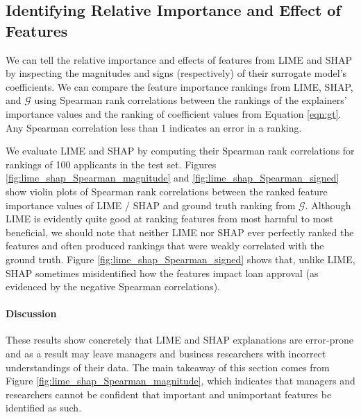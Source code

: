 \documentclass[12pt]{article}    %
\begin{document}
    \subsection*{Identifying Relative Importance and Effect of Features}
        \label{sec:relative_and_signed_importance}
        We can tell the relative importance and effects of features from LIME and SHAP by inspecting the magnitudes and signs (respectively) of their surrogate model's coefficients. We can compare the feature importance rankings from LIME, SHAP, and $\mathcal{G}$ using Spearman rank correlations between the rankings of the explainers' importance values and the ranking of coefficient values from Equation \ref{eqn:gt}. Any Spearman correlation less than 1 indicates an error in a ranking.%
 
                        
        We evaluate LIME and SHAP by computing their Spearman rank correlations for rankings of 100 applicants in the test set. Figures \ref{fig:lime_shap_Spearman_magnitude} and \ref{fig:lime_shap_Spearman_signed} show violin plots of Spearman rank correlations between the ranked feature importance values of LIME / SHAP and ground truth ranking from $\mathcal{G}$. Although LIME is evidently quite good at ranking features from most harmful to most beneficial, we should note that neither LIME nor SHAP ever perfectly ranked the features and often produced rankings that were weakly correlated with the ground truth. Figure \ref{fig:lime_shap_Spearman_signed} shows that, unlike LIME, SHAP sometimes misidentified how the features impact loan approval (as evidenced by the negative Spearman correlations).%
                        
        \paragraph{Discussion}
            These results show concretely that LIME and SHAP explanations are error-prone and as a result may leave managers and business researchers with incorrect understandings of their data. The main takeaway of this section comes from Figure \ref{fig:lime_shap_Spearman_magnitude}, which indicates that managers and researchers cannot be confident that important and unimportant features be identified as such.
\end{document}
